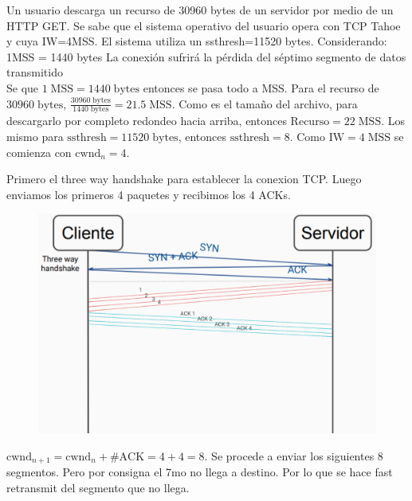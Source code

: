 \documentclass[titlepage,a4paper]{article}
\begin{document}
Un usuario descarga un recurso de 30960 bytes de un servidor por medio de un HTTP GET. Se sabe que el sistema operativo del usuario opera con TCP Tahoe y cuya IW=4MSS. El sistema utiliza un ssthresh=11520 bytes. Considerando: 1MSS = 1440 bytes
La conexión sufrirá la pérdida del séptimo segmento de datos transmitido \\

Se que $ 1 \; \mathrm{MSS} = 1440 \; \mathrm{bytes} $ entonces se pasa todo a MSS. Para el recurso de $ 30960 \; \mathrm{bytes} $, $ \frac{30960 \; \mathrm{bytes} }{1440 \; \mathrm{bytes}} = 21.5 \; \mathrm{MSS}$. Como es el tamaño del archivo, para descargarlo por completo redondeo hacia arriba, entonces $ \mathrm{Recurso} = 22 \; \mathrm{MSS} $. Los mismo para $\mathrm{ssthresh}= 11520 \;\mathrm{bytes}$, entonces $\mathrm{ssthresh}= 8$. 
Como $\mathrm{IW} = 4 \; \mathrm{MSS}$ se comienza con $ \mathrm{cwnd}_n = 4$.



Primero el three way handshake para establecer la conexion TCP. Luego enviamos los primeros 4 paquetes y recibimos los 4 ACKs.


\begin{figure}[H]
\centering
\includegraphics[width=\textwidth]{imagenes/resEj11.png}
\end{figure}

$ \mathrm{cwnd}_{n+1} = \mathrm{cwnd}_{n} + \#\mathrm{ACK} = 4 + 4 = 8 $. Se procede a enviar los siguientes 8 segmentos. Pero por consigna el 7mo no llega a destino. Por lo que se hace fast retransmit del segmento que no llega.
\end{document}
